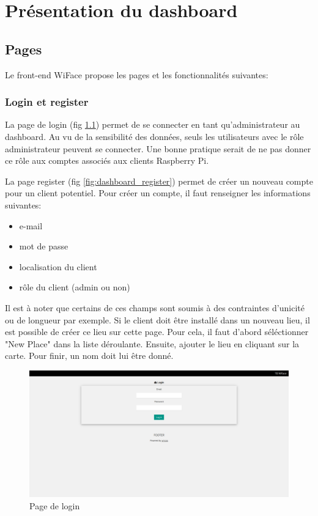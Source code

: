 \chapter{Présentation du dashboard}
\label{ch:dashboard}
\section{Pages}
Le front-end WiFace propose les pages et les fonctionnalités suivantes:
\subsection{Login et register}

La page de login (fig \ref{fig:dashboard_login}) permet de se connecter en tant qu'administrateur au dashboard.
Au vu de la sensibilité des données, seuls les utilisateurs avec le rôle administrateur peuvent se connecter.
Une bonne pratique serait de ne pas donner ce rôle aux comptes associés aux clients Raspberry Pi.

La page register (fig \ref{fig:dashboard_register}) permet de créer un nouveau compte pour un client potentiel.
Pour créer un compte, il faut renseigner les informations suivantes:
\begin{itemize}
    \item e-mail
    \item mot de passe
    \item localisation du client
    \item rôle du client (admin ou non) 
\end{itemize}

Il est à noter que certains de ces champs sont soumis à des contraintes d'unicité ou de longueur par exemple.
Si le client doit être installé dans un nouveau lieu, il est possible de créer ce lieu sur cette page. 
Pour cela, il faut d'abord séléctionner "New Place" dans la liste déroulante. Ensuite, ajouter le lieu en cliquant sur la carte. Pour
finir, un nom doit lui être donné. 

\clearpage
\newpage
\thispagestyle{empty}
\begin{landscape}
    \centering
\thispagestyle{empty}
\begin{figure}[H]
	\includegraphics[width=0.95\linewidth]{images/dashboard/login.png}
	\caption{Page de login}
	\label{fig:dashboard_login}
\end{figure}
\end{landscape}

